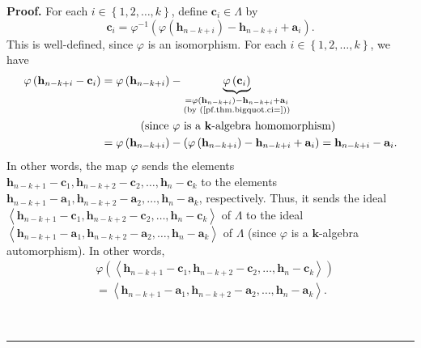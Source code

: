 \documentclass[numbers=enddot,12pt,final,onecolumn,notitlepage]{scrartcl}%
\theoremstyle{definition}
\newenvironment{proof}[1][Proof]{\noindent\textbf{#1.} }{\ \rule{0.5em}{0.5em}}
\begin{document}
\begin{proof}
For each $i\in\left\{  1,2,\ldots,k\right\}  $, define $\mathbf{c}_{i}%
\in\Lambda$ by
\begin{equation}
\mathbf{c}_{i}=\varphi^{-1}\left(  \varphi\left(  \mathbf{h}_{n-k+i}\right)
-\mathbf{h}_{n-k+i}+\mathbf{a}_{i}\right)  . \label{pf.thm.bigquot.ci=}%
\end{equation}
This is well-defined, since $\varphi$ is an isomorphism. For each
$i\in\left\{  1,2,\ldots,k\right\}  $, we have
\begin{align*}
\varphi\left(  \mathbf{h}_{n-k+i}-\mathbf{c}_{i}\right)   &  =\varphi\left(
\mathbf{h}_{n-k+i}\right)  -\underbrace{\varphi\left(  \mathbf{c}_{i}\right)
}_{\substack{=\varphi\left(  \mathbf{h}_{n-k+i}\right)  -\mathbf{h}%
_{n-k+i}+\mathbf{a}_{i}\\\text{(by (\ref{pf.thm.bigquot.ci=}))}}}\\
&  \ \ \ \ \ \ \ \ \ \ \left(  \text{since }\varphi\text{ is a }%
\mathbf{k}\text{-algebra homomorphism}\right) \\
&  =\varphi\left(  \mathbf{h}_{n-k+i}\right)  -\left(  \varphi\left(
\mathbf{h}_{n-k+i}\right)  -\mathbf{h}_{n-k+i}+\mathbf{a}_{i}\right)
=\mathbf{h}_{n-k+i}-\mathbf{a}_{i}.
\end{align*}
In other words, the map $\varphi$ sends the elements $\mathbf{h}%
_{n-k+1}-\mathbf{c}_{1},\mathbf{h}_{n-k+2}-\mathbf{c}_{2},\ldots
,\mathbf{h}_{n}-\mathbf{c}_{k}$ to the elements $\mathbf{h}_{n-k+1}%
-\mathbf{a}_{1},\mathbf{h}_{n-k+2}-\mathbf{a}_{2},\ldots,\mathbf{h}%
_{n}-\mathbf{a}_{k}$, respectively. Thus, it sends the ideal $\left\langle
\mathbf{h}_{n-k+1}-\mathbf{c}_{1},\mathbf{h}_{n-k+2}-\mathbf{c}_{2}%
,\ldots,\mathbf{h}_{n}-\mathbf{c}_{k}\right\rangle $ of $\Lambda$ to the ideal
\newline$\left\langle \mathbf{h}_{n-k+1}-\mathbf{a}_{1},\mathbf{h}%
_{n-k+2}-\mathbf{a}_{2},\ldots,\mathbf{h}_{n}-\mathbf{a}_{k}\right\rangle $ of
$\Lambda$ (since $\varphi$ is a $\mathbf{k}$-algebra automorphism). In other
words,%
\begin{align}
&  \varphi\left(  \left\langle \mathbf{h}_{n-k+1}-\mathbf{c}_{1}%
,\mathbf{h}_{n-k+2}-\mathbf{c}_{2},\ldots,\mathbf{h}_{n}-\mathbf{c}%
_{k}\right\rangle \right) \nonumber\\
&  =\left\langle \mathbf{h}_{n-k+1}-\mathbf{a}_{1},\mathbf{h}_{n-k+2}%
-\mathbf{a}_{2},\ldots,\mathbf{h}_{n}-\mathbf{a}_{k}\right\rangle .
\label{pf.thm.bigquot.phiideal1}%
\end{align}



\end{proof}
\end{document}
